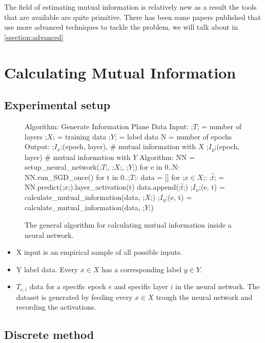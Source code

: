\documentclass[dissertation.tex]{subfiles}
\begin{document}
The field of estimating mutual information is relatively new as a result the
tools that are available are quite primitive. There has been some papers
published that use more advanced techniques to tackle the problem, we will talk
about in \autoref{ssection:advanced}

\section{Calculating Mutual Information}

\subsection{Experimental setup}

\begin{figure}[H]
    \begin{pythonfigure}
      Algorithm: Generate Information Plane Data
      Input:
      ;$T$; = number of layers
      ;$X$; = training data
      ;$Y$; = label data
      N = number of epochs
      Output: 
      ;$I_x$;(epoch, layer), # mutual information with $X$ 
      ;$I_y$;(epoch, layer)  # mutual information with $Y$ 
      Algorithm:
      NN = setup_neural_network(;$T$;, ;$X$;, ;$Y$;)
      for e in 0..N:
        NN.run_SGD_once()
        for t in 0..;$T$;:
          data = []
          for ;$x \in X$;:
            ;$\hat{t}$; = NN.predict(;$x$;).layer_activation(t)
            data.append(;$\hat{t}$;)
          ;$I_x$;(e, t) = calculate_mutual_information(data, ;$X$;)
          ;$I_y$;(e, t) = calculate_mutual_information(data, ;$Y$;)
    \end{pythonfigure}
    \caption{The general algorithm for calculating mutual information inside a
    neural network.}
    \label{fig:general}
\end{figure}

\begin{itemize}
  \item{
      X input is an empirical sample of all possible inputs.
    }
  \item{
      Y label data. Every $x \in X$ has a corresponding label $y \in Y$. 
    }
  \item{
      $T_{e,i}$ data for a specific epoch $e$ and specific layer $i$ in the
      neural network. The dataset is  generated by feeding every $x \in X$
      trough the neural network and recording the activations.
    }
\end{itemize}

\subsection{Discrete method} 
\end{document}
